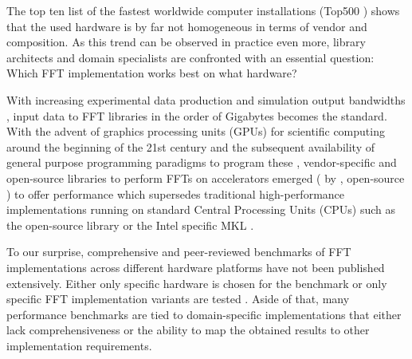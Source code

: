 The top ten list of the fastest worldwide computer installations (Top500 \citep{meuer2011top500}) shows that the used hardware is by far not homogeneous in terms of vendor and composition. As this trend can be observed in practice even more, library architects and domain specialists are confronted with an essential question: Which FFT implementation works best on what hardware?  

With increasing experimental data production \citep{huisken2004optical} and simulation output bandwidths \citep{maronga2015parallelized}, input data to FFT libraries in the order of Gigabytes becomes the standard. With the advent of graphics processing units (GPUs) for scientific computing around the beginning of the 21st century and the subsequent availability of general purpose programming paradigms to program these \citep{du2012cuda}, vendor-specific and open-source libraries to perform FFTs on accelerators emerged (\cufft{} \citep{nvidia2010cufft} by \nvidia{}, open-source \clfft{} \citep{clfft}) to offer performance which supersedes traditional high-performance implementations running on standard Central Processing Units (CPUs) such as the open-source \fftw{} library \citep{FFTW05} or the Intel specific MKL \citep{intel2007intel}.


%
To our surprise, comprehensive and peer-reviewed benchmarks of FFT implementations across different hardware platforms have not been published extensively. Either only specific hardware is chosen for the benchmark \citep{park2015fast,eleftheriou2005performance,Akin:15} or only specific FFT implementation variants are tested \citep{shoc2010,dongarra2013hpc}. Aside of that, many performance benchmarks are tied to domain-specific implementations \citep{fialka2006fft} that either lack comprehensiveness or the ability to map the obtained results to other implementation requirements.

